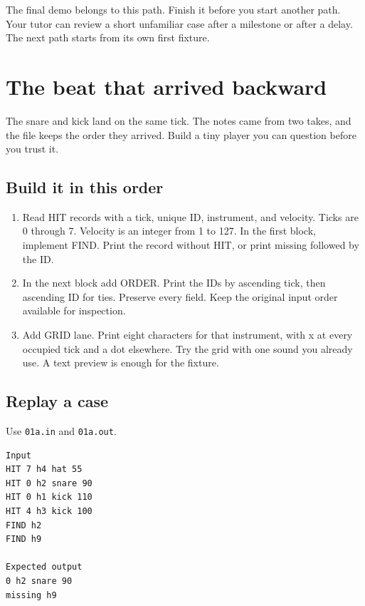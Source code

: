 \documentclass[11pt,letterpaper]{article}
\begin{document}
The final demo belongs to this path. Finish it before you start another path. Your tutor can review a short unfamiliar case after a milestone or after a delay. The next path starts from its own first fixture.

\clearpage

\section{The beat that arrived backward}\label{groovebox:01}

The snare and kick land on the same tick. The notes came from two takes, and the file keeps the order they arrived. Build a tiny player you can question before you trust it.

\subsection*{Build it in this order}

\begin{enumerate}
\item Read HIT records with a tick, unique ID, instrument, and velocity. Ticks are 0 through 7. Velocity is an integer from 1 to 127. In the first block, implement FIND. Print the record without HIT, or print missing followed by the ID.
\item In the next block add ORDER. Print the IDs by ascending tick, then ascending ID for ties. Preserve every field. Keep the original input order available for inspection.
\item Add GRID lane. Print eight characters for that instrument, with x at every occupied tick and a dot elsewhere. Try the grid with one sound you already use. A text preview is enough for the fixture.
\end{enumerate}

\subsection*{Replay a case}

Use \texttt{01a.in} and \texttt{01a.out}.

\begin{samepage}
\small
\begin{verbatim}
Input
HIT 7 h4 hat 55
HIT 0 h2 snare 90
HIT 0 h1 kick 110
HIT 4 h3 kick 100
FIND h2
FIND h9

Expected output
0 h2 snare 90
missing h9
\end{verbatim}
\end{samepage}
\end{document}
